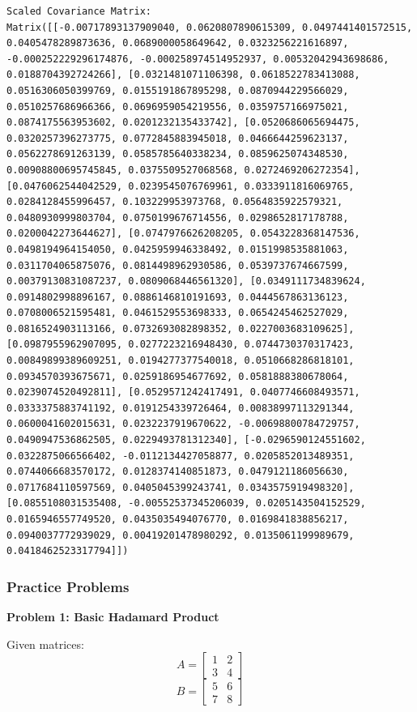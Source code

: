 \documentclass[
  letterpaper,
  DIV=11,
  numbers=noendperiod]{scrreprt}
\theoremstyle{plain}
\theoremstyle{definition}
\theoremstyle{remark}
\begin{document}
\begin{verbatim}
Scaled Covariance Matrix:
Matrix([[-0.00717893137909040, 0.0620807890615309, 0.0497441401572515, 0.0405478289873636, 0.0689000058649642, 0.0323256221616897, -0.000252229296174876, -0.000258974514952937, 0.00532042943698686, 0.0188704392724266], [0.0321481071106398, 0.0618522783413088, 0.0516306050399769, 0.0155191867895298, 0.0870944229566029, 0.0510257686966366, 0.0696959054219556, 0.0359757166975021, 0.0874175563953602, 0.0201232135433742], [0.0520686065694475, 0.0320257396273775, 0.0772845883945018, 0.0466644259623137, 0.0562278691263139, 0.0585785640338234, 0.0859625074348530, 0.00908800695745845, 0.0375509527068568, 0.0272469206272354], [0.0476062544042529, 0.0239545076769961, 0.0333911816069765, 0.0284128455996457, 0.103229953973768, 0.0564835922579321, 0.0480930999803704, 0.0750199676714556, 0.0298652817178788, 0.0200042273644627], [0.0747976626208205, 0.0543228368147536, 0.0498194964154050, 0.0425959946338492, 0.0151998535881063, 0.0311704065875076, 0.0814498962930586, 0.0539737674667599, 0.00379130831087237, 0.0809068446561320], [0.0349111734839624, 0.0914802998896167, 0.0886146810191693, 0.0444567863136123, 0.0708006521595481, 0.0461529553698333, 0.0654245462527029, 0.0816524903113166, 0.0732693082898352, 0.0227003683109625], [0.0987955962907095, 0.0277223216948430, 0.0744730370317423, 0.00849899389609251, 0.0194277377540018, 0.0510668286818101, 0.0934570393675671, 0.0259186954677692, 0.0581888380678064, 0.0239074520492811], [0.0529571242417491, 0.0407746608493571, 0.0333375883741192, 0.0191254339726464, 0.00838997113291344, 0.0600041602015631, 0.0232237919670622, -0.00698800784729757, 0.0490947536862505, 0.0229493781312340], [-0.0296590124551602, 0.0322875066566402, -0.0112134427058877, 0.0205852013489351, 0.0744066683570172, 0.0128374140851873, 0.0479121186056630, 0.0717684110597569, 0.0405045399243741, 0.0343575919498320], [0.0855108031535408, -0.00552537345206039, 0.0205143504152529, 0.0165946557749520, 0.0435035494076770, 0.0169841838856217, 0.0940037772939029, 0.00419201478980292, 0.0135061199989679, 0.0418462523317794]])
\end{verbatim}

\subsubsection{Practice Problems}\label{practice-problems-1}

\textbf{Problem 1: Basic Hadamard Product}

Given matrices: \[A=\begin{bmatrix}1&2\\3&4\end{bmatrix}\]
\[B=\begin{bmatrix}5&6\\7&8\end{bmatrix}\]
\end{document}
